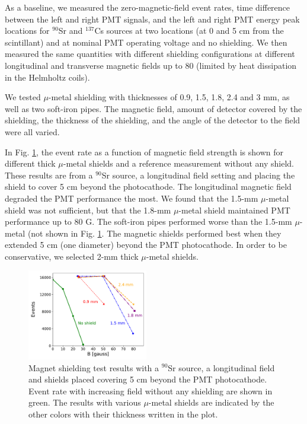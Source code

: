 \documentclass[3p,final,twocolumn]{elsarticle}
\begin{document}
  As a baseline, we measured the zero-magnetic-field 
event rates, time difference between the left and right PMT signals,
and the left and right PMT energy peak locations for $^{90}$Sr and
  $^{137}$Cs sources at two locations (at 0 and 5 \si{\centi\meter} from the scintillant) and  at nominal
  PMT operating voltage and no shielding.  We then measured the same quantities with different
  shielding configurations at different longitudinal and transverse
  magnetic fields up to 80 \si{\gauss} (limited by heat dissipation in the
  Helmholtz coils).

  We tested $\mu$-metal shielding with  thicknesses of 0.9, 1.5, 1.8,
  2.4 and 3 \si{\milli\meter}, as well as two soft-iron pipes. The magnetic field, amount of detector covered by the
  shielding, the thickness of the shielding, and the angle of the detector to the field were
  all varied.
  
In Fig. \ref{fig:shielding_results}, the event rate as a function of magnetic field strength is shown for different  thick $\mu$-metal shields and a reference measurement without any shield. These results are from a $^{90}$Sr source, a longitudinal field setting and placing the shield to cover 5 \si{\centi\meter} beyond the photocathode. 
The longitudinal magnetic field degraded the PMT performance
the most.  We found that the 1.5-\si{\milli\meter} $\mu$-metal shield was not
sufficient, but that the 1.8-\si{\milli\meter} $\mu$-metal shield maintained PMT
performance up to 80 G.  The soft-iron pipes performed worse than the
1.5-\si{\milli\meter} $\mu$-metal (not shown in Fig. \ref{fig:shielding_results}. The magnetic shields performed best when they
extended 5 \si{\centi\meter} (one diameter) beyond the PMT photocathode.  In order to
be conservative, we selected 2-mm thick $\mu$-metal shields.

\begin{figure}[tb]
	\centering
			\includegraphics[width=0.47\textwidth]{shielding_results.pdf}
	\caption{Magnet shielding test results with a $^{90}$Sr source, a longitudinal field and shields placed covering 5 \si{\centi\meter} beyond the PMT photocathode. Event rate with increasing field without any shielding are shown in green. The results with various $\mu$-metal shields are indicated by the other colors with their thickness written in the plot. }
	\label{fig:shielding_results}
\end{figure}
\end{document}
